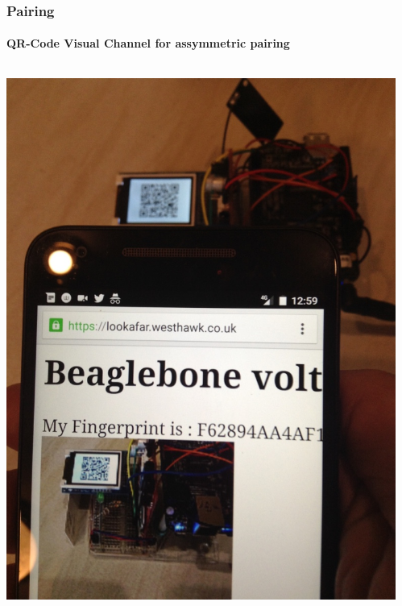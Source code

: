 \documentclass[handout, notes=hide]{beamer}
\begin{document}
\begin{frame}
\frametitle{Pairing}
\framesubtitle{QR-Code Visual Channel for assymmetric pairing}

\begin{columns}[T]
\begin{column}[T]{0.33333\textwidth}
\includegraphics[width=1.0\textwidth]{iot-screen}
\end{column}
\begin{column}[T]{0.33333\textwidth}

\end{column}
\end{columns}
\end{frame}
\end{document}
